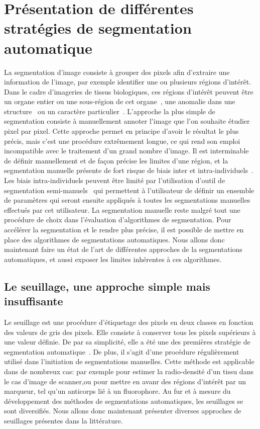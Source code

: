 \documentclass[\main/main.tex]{subfiles}
\begin{document}
            
\section{Présentation de différentes stratégies de segmentation automatique}
%
La segmentation d'image consiste à grouper des pixels afin d'extraire une information de l'image, par exemple identifier une ou plusieurs régions d'intérêt.
%
Dans le cadre d'imageries de tissus biologiques,
ces régions d'intérêt peuvent être un organe entier ou une sous\hyp{}région de cet organe~\cite{early_2018,liu_2020,gupta_2018},
une anomalie dans une structure~\cite{wadhwa_2019,huang_2019,ruikar_2019}
ou un caractère particulier~\cite{teixid_2019}.
%
L'approche la plus simple de segmentation consiste à manuellement annoter l'image que l'on souhaite étudier pixel par pixel.
%
Cette approche permet en principe d'avoir le résultat le plus précis,
mais c'est une procédure extrêmement longue, ce qui rend son emploi incompatible avec le traitement d'un grand nombre d'image.
%
Il est interminable de définir manuellement et de façon précise les limites d'une région, et la segmentation manuelle présente de fort risque de biais inter et intra\hyp{}individuels~\cite{heye_2013}.
%
Les biais intra\hyp{}individuels peuvent être limité par l'utilisation d'outil de segmentation semi\hyp{}manuels~\cite{berg_2019,benenson_2019} qui permettent à l'utilisateur de définir un ensemble de paramètres qui seront ensuite appliqués à toutes les segmentations manuelles effectués par cet utilisateur.
%
La segmentation manuelle reste malgré tout une procédure de choix dans l'évaluation d'algorithmes de segmentation.
%
Pour accélérer la segmentation et le rendre plus précise, il est possible de mettre en place des algorithmes de segmentations automatiques.
%
Nous allons donc maintenant faire un état de l'art de différentes approches de la segmentations automatiques, et aussi exposer les limites inhérentes à ces algorithmes.

    \subsection{Le seuillage, une approche simple mais insuffisante\label{sec:intro:seuilage}}
    
%
Le seuillage est une procédure d'étiquetage des pixels en deux classes en fonction des valeurs de gris des pixels. Elle consiste à conserver tous les pixels supérieurs à une valeur définie. De par sa simplicité, elle a été une des premières stratégie de segmentation automatique~\cite{sakai_1969,otsu_1979}.
%
De plus, il s'agit d'une procédure régulièrement utilisé dans l'initiation de segmentations manuelles.
%
Cette méthode est applicable dans de nombreux cas: par exemple pour estimer la radio\hyp{}densité d'un tissu dans le cas d'image de scanner,ou pour mettre en avanr des régions d'intérêt par un marqueur, tel qu'un anticorps lié à un fluorophore.
%
Au fur et à mesure du développement des méthodes de segmentations automatiques, les seuillages se sont diversifiés.
Nous allons donc maintenant présenter diverses approches de seuillages présentes dans la littérature.
\end{document}
